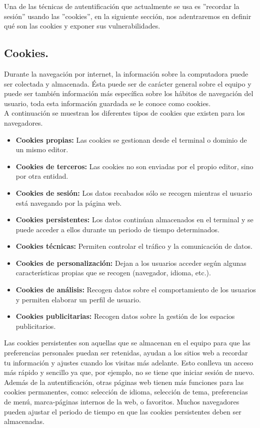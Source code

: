 \documentclass[12pt, a4paper, titlepage]{report}
\begin{document}
	    Una de las técnicas de autentificación que actualmente se usa es ''recordar la sesión'' usando las ''cookies'', en la siguiente sección, nos adentraremos en definir qué son las cookies y exponer sus vulnerabilidades.
	    
	    \subsection{Cookies. }
		Durante la navegación por internet, la información sobre la computadora puede ser colectada y almacenada. Ésta puede ser de carácter general sobre el equipo y puede ser también información más específica sobre los hábitos de navegación del usuario, toda esta información guardada se le conoce como \Gls{cookies}. \\
		A continuación se muestran los diferentes tipos de cookies que existen para los navegadores.
		
		\begin{itemize}
		    \item \textbf{Cookies propias:} Las cookies se gestionan desde el terminal o dominio de un mismo editor.
		    \item \textbf{Cookies de terceros:} Las cookies no son enviadas por el propio editor, sino por otra entidad.  
		    \item \textbf{Cookies de sesión:} Los datos recabados sólo se recogen mientras el usuario está navegando por la página web.
		    \item \textbf{Cookies persistentes:} Los datos continúan almacenados en el terminal y se puede acceder a ellos durante un periodo de tiempo determinados.
		    \item \textbf{Cookies técnicas:} Permiten controlar el tráfico y la comunicación de datos.		
            \item \textbf{Cookies de personalización:} Dejan a los usuarios acceder según algunas características propias que se recogen (navegador, idioma, etc.).
            \item \textbf{Cookies de análisis:} Recogen datos sobre el comportamiento de los usuarios y permiten elaborar un perfil de usuario.
            \item \textbf{Cookies publicitarias:} Recogen datos sobre la gestión de los espacios publicitarios.
        \end{itemize}
		
		Las cookies persistentes son aquellas que se almacenan en el equipo para que las preferencias personales puedan ser retenidas, ayudan a los sitios web a recordar tu información y ajustes cuando los visitas más adelante. Esto conlleva un acceso más rápido y sencillo ya que, por ejemplo, no se tiene que iniciar sesión de nuevo. Además de la autentificación, otras páginas web tienen más funciones para las cookies permanentes, como: selección de idioma, selección de tema, preferencias de menú, marca-páginas internos de la web, o favoritos.
		Muchos navegadores pueden ajustar el periodo de tiempo en que las cookies persistentes deben ser almacenadas. \\
		
\end{document}
